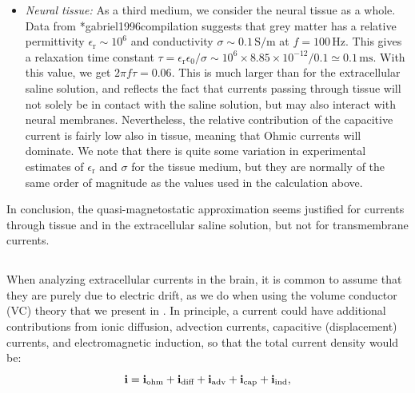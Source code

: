 \begin{itemize}
\item \textit{Neural tissue:} As a third medium, we consider the neural tissue as a whole. Data from \citeasnoun**{gabriel1996compilation} suggests that grey matter has a relative permittivity $\epsilon_\text{r} \sim 10^6$ and conductivity $\sigma \sim 0.1 \, \si{\siemens\per\metre}$ at $f = 100 \, \si{\hertz}$. This gives a relaxation time constant $\tau = \epsilon_\text{r} \epsilon_0/\sigma \sim 10^6\times 8.85\times10^{-12}/0.1 \simeq 0.1 \, \si{\milli\second}$. With this value, we get $2 \pi f \tau =  0.06$. This is much larger than for the extracellular saline solution, and reflects the fact that currents passing through tissue will not solely be in contact with the saline solution, but may also interact with neural membranes. Nevertheless, the relative contribution of the capacitive current is fairly low also in tissue, meaning that Ohmic currents will dominate. We note that there is quite some variation in experimental estimates of  $\epsilon_\text{r}$ and $\sigma$ for the tissue medium, but they are normally of the same order of magnitude as the values used in the calculation above.
\end{itemize}

In conclusion, the quasi-magnetostatic approximation seems justified for currents through tissue and in the extracellular saline solution, but not for transmembrane currents.



\subsection{}
\label{sec:Basics:onlyohmic}
When analyzing extracellular currents in the brain, it is common to assume that they are purely due to electric drift, as we do when using the volume conductor (VC) theory that we present in . In principle, a current could have additional contributions from ionic diffusion, advection currents, capacitive (displacement) currents, and electromagnetic induction, so that the total current density would be:
\begin{equation}
{\bf i} = {\bf i}_\text{ohm} + {\bf i}_\text{diff} + {\bf i}_\text{adv} + {\bf i}_\text{cap} + {\bf i}_\text{ind}, 
\label{VC:eq:generalcurrent}
\end{equation}

